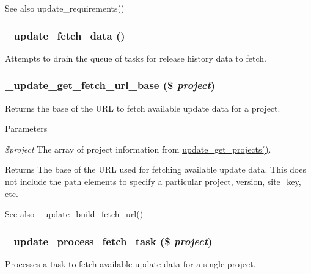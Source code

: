 \begin{DoxySeeAlso}{See also}
update\_\-requirements() 
\end{DoxySeeAlso}
\hypertarget{update_8fetch_8inc_a3a3122bc6fdfe23091d8db56e4430aeb}{
\subsubsection[{\_\-update\_\-fetch\_\-data}]{\setlength{\rightskip}{0pt plus 5cm}\_\-update\_\-fetch\_\-data ()}}
\label{update_8fetch_8inc_a3a3122bc6fdfe23091d8db56e4430aeb}
Attempts to drain the queue of tasks for release history data to fetch. \hypertarget{update_8fetch_8inc_a53552af8849428ac6faba273936eb00a}{
\subsubsection[{\_\-update\_\-get\_\-fetch\_\-url\_\-base}]{\setlength{\rightskip}{0pt plus 5cm}\_\-update\_\-get\_\-fetch\_\-url\_\-base (\$ {\em project})}}
\label{update_8fetch_8inc_a53552af8849428ac6faba273936eb00a}
Returns the base of the URL to fetch available update data for a project.


\begin{DoxyParams}{Parameters}
\item[{\em \$project}]The array of project information from \hyperlink{update_8compare_8inc_a7e1ea49d91f2d2b81b8101d481d10300}{update\_\-get\_\-projects()}.\end{DoxyParams}
\begin{DoxyReturn}{Returns}
The base of the URL used for fetching available update data. This does not include the path elements to specify a particular project, version, site\_\-key, etc.
\end{DoxyReturn}
\begin{DoxySeeAlso}{See also}
\hyperlink{update_8fetch_8inc_a6d937d41a6ccf645109deefae0f6e5d3}{\_\-update\_\-build\_\-fetch\_\-url()} 
\end{DoxySeeAlso}
\hypertarget{update_8fetch_8inc_a49b627a7dcb3c714f088bc0e7ef40e85}{
\subsubsection[{\_\-update\_\-process\_\-fetch\_\-task}]{\setlength{\rightskip}{0pt plus 5cm}\_\-update\_\-process\_\-fetch\_\-task (\$ {\em project})}}
\label{update_8fetch_8inc_a49b627a7dcb3c714f088bc0e7ef40e85}
Processes a task to fetch available update data for a single project.

